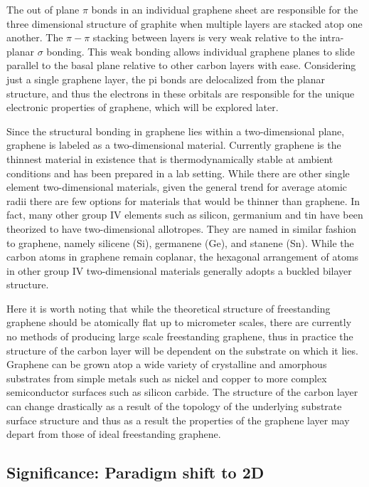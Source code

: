  The out of plane $\pi$ bonds in an individual graphene sheet are responsible for the three dimensional structure of graphite when multiple layers are stacked atop one another. The $\pi-\pi$ stacking between layers is very weak relative to the intra-planar $\sigma$ bonding. This weak bonding allows individual graphene planes to slide parallel to the basal plane relative to other carbon layers with ease. Considering just a single graphene layer, the pi bonds are delocalized from the planar structure, and thus the electrons in these orbitals are responsible for the unique electronic properties of graphene, which will be explored later.

 Since the structural bonding in graphene lies within a two-dimensional plane, graphene is labeled as a two-dimensional material. Currently graphene is the thinnest material in existence that is thermodynamically stable at ambient conditions and has been prepared in a lab setting. While there are other single element two-dimensional materials, given the general trend for average atomic radii there are few options for materials that would be thinner than graphene. In fact, many other group IV elements such as silicon, germanium and tin have been theorized to have two-dimensional allotropes. They are named in similar fashion to graphene, namely silicene (Si), germanene (Ge), and stanene (Sn). While the carbon atoms in graphene remain coplanar, the hexagonal arrangement of atoms in other group IV two-dimensional materials generally adopts a buckled bilayer structure.

Here it is worth noting that while the theoretical structure of freestanding graphene should be atomically flat up to micrometer scales, there are currently no methods of producing large scale freestanding graphene, thus in practice the structure of the carbon layer will be dependent on the substrate on which it lies. Graphene can be grown atop a wide variety of crystalline and amorphous substrates from simple metals such as nickel and copper to more complex semiconductor surfaces such as silicon carbide. The structure of the carbon layer can change drastically as a result of the topology of the underlying substrate surface structure and thus as a result the properties of the graphene layer may depart from those of ideal freestanding graphene.

  \subsection{Significance: Paradigm shift to 2D}

